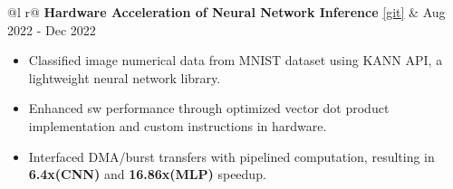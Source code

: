 \documentclass[a4paper,10pt]{article}
\begin{document}
\begin{tabularx}{\linewidth}{ @{}l r@{} }
    \textbf{Hardware Acceleration of Neural Network Inference} \href{https://github.com/sharathat45/Vector-dot-product}{[\underline{git}]} & \hfill {\small Aug 2022 - Dec 2022} \\[2.75pt]
    {
        \begin{minipage}[t]{\linewidth}
            \begin{itemize}[nosep,after=\strut, leftmargin=2em, itemsep=3pt]
                \item Classified image numerical data from MNIST dataset using KANN API, a lightweight neural network library.
                \item Enhanced sw performance through optimized vector dot product implementation and custom instructions in hardware.
                \item Interfaced DMA/burst transfers with pipelined computation, resulting in \textbf{6.4x(CNN)} and \textbf{16.86x(MLP)} speedup.
            \end{itemize}
        \end{minipage}
    }
\end{tabularx}
\vspace{0.1cm}

\end{document}
